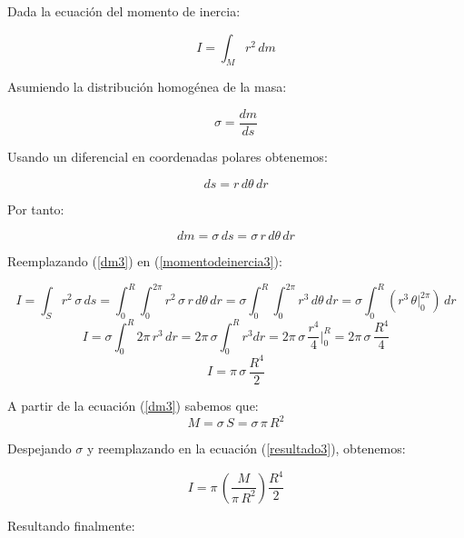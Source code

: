 \documentclass[letter,11pt]{article}
\begin{document}
Dada la ecuación del momento de inercia:

\begin{equation}
    I = \int_{M} r^2\, dm
\label{momentodeinercia3}
\end{equation}

Asumiendo la distribución homogénea de la masa:

\begin{equation*}
    \sigma = \frac{dm}{ds}
\end{equation*}

Usando un diferencial en coordenadas polares obtenemos:

\begin{equation*}
    ds = r\, d\theta\, dr
\end{equation*}

Por tanto:

\begin{equation}
    dm = \sigma\, ds = \sigma\, r\, d\theta\, dr
\label{dm3}
\end{equation}

Reemplazando (\ref{dm3}) en (\ref{momentodeinercia3}):

\begin{equation*}
    I = \int_{S} r^2\, \sigma\, ds = \int_{0}^{R} \int_{0}^{2\pi} r^2\, \sigma\, r\, d\theta\, dr = \sigma \int_{0}^{R} \int_{0}^{2\pi} r^3\, d\theta\, dr = \sigma \int_{0}^{R} ( r^3\, \theta \Biggr|_{0}^{2\pi} )\, dr
\end{equation*}
\begin{equation*}
    I = \sigma \int_{0}^{R} 2\pi\, r^3\, dr = 2\pi\, \sigma \int_{0}^{R} r^3 dr = 2\pi\, \sigma\, \frac{r^4}{4} \Biggr|_{0}^{R} = 2\pi\, \sigma\, \frac{R^4}{4}
\end{equation*}
\begin{equation}
    I = \pi\, \sigma\, \frac{R^4}{2}
\label{resultado3}
\end{equation}

A partir de la ecuación (\ref{dm3}) sabemos que:
\begin{equation*}
    M = \sigma\, S = \sigma\, \pi\, R^2
\end{equation*}

Despejando $\sigma$ y reemplazando en la ecuación (\ref{resultado3}), obtenemos:

\begin{equation*}
    I = \pi\, \left( \frac{M}{\pi\, R^2} \right) \frac{R^4}{2}
\end{equation*}

Resultando finalmente:
\end{document}
